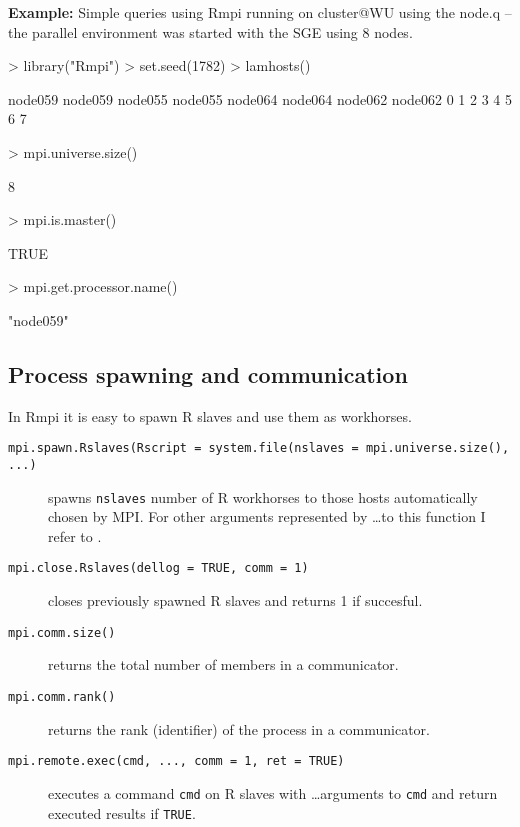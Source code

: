 \textbf{Example:} Simple queries using Rmpi \newline
running on cluster@WU using the node.q -- the parallel environment was
started with the SGE using 8 nodes.

\begin{Schunk}
\begin{Sinput}
> library("Rmpi")
> set.seed(1782)
> lamhosts()
\end{Sinput}
\begin{Soutput}
node059 node059 node055 node055 node064 node064 node062 node062 
      0       1       2       3       4       5       6       7 
\end{Soutput}
\begin{Sinput}
> mpi.universe.size()
\end{Sinput}
\begin{Soutput}
[1] 8
\end{Soutput}
\begin{Sinput}
> mpi.is.master()
\end{Sinput}
\begin{Soutput}
[1] TRUE
\end{Soutput}
\begin{Sinput}
> mpi.get.processor.name()
\end{Sinput}
\begin{Soutput}
[1] "node059"
\end{Soutput}
\end{Schunk}

\subsection{Process spawning and communication}

In Rmpi it is easy to spawn R slaves and use them as workhorses.


\begin{description}

\item[\texttt{mpi.spawn.Rslaves(Rscript =
    system.file(nslaves =
    mpi.universe.size(), ...)}] spawns \texttt{nslaves} number of R
  workhorses to those hosts automatically chosen by MPI. For other
  arguments represented by \ldots to this function I refer to
  \cite{yu06Rmpi}.
\item[\texttt{mpi.close.Rslaves(dellog = TRUE, comm = 1)}] closes
  previously spawned R slaves and returns 1 if succesful.
\item[\texttt{mpi.comm.size()}] returns the total number of members in
  a communicator.
\item[\texttt{mpi.comm.rank()}] returns the rank (identifier) of the
  process in a communicator.
\item[\texttt{mpi.remote.exec(cmd, ..., comm = 1, ret = TRUE)}]
  executes a command \texttt{cmd} on R slaves with \ldots arguments to
  \texttt{cmd} and return executed results if \texttt{TRUE}.
\end{description}

